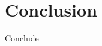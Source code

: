 \documentclass[conference,a4paper]{IEEEtran}
\begin{document}
\section{Conclusion}
Conclude \\

%



\end{document}
